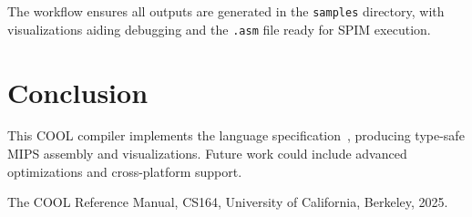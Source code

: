 \documentclass[11pt, titlepage]{article}
\begin{document}
The workflow ensures all outputs are generated in the \texttt{samples} directory, with visualizations aiding debugging and the \texttt{.asm} file ready for SPIM execution.

\section{Conclusion}
\label{sec:conclusion}

This COOL compiler implements the language specification~\cite{cool_manual}, producing type-safe MIPS assembly and visualizations. Future work could include advanced optimizations and cross-platform support.

\begin{thebibliography}{1}
The COOL Reference Manual, CS164, University of California, Berkeley, 2025.
\end{thebibliography}
\end{document}
